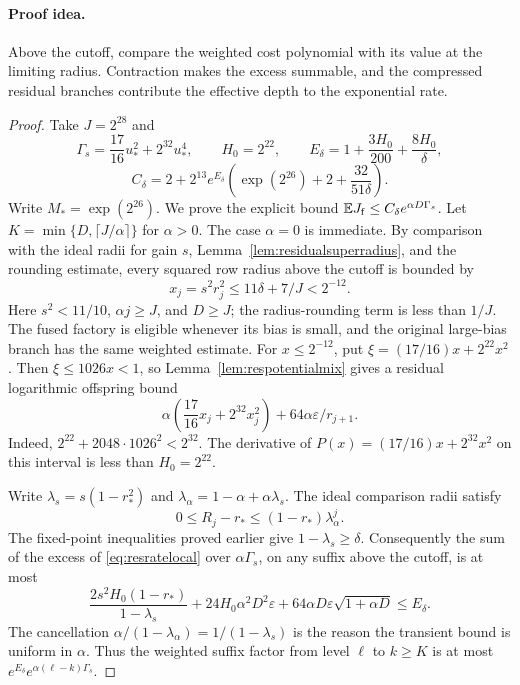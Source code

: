 \paragraph{Proof idea.}
Above the cutoff, compare the weighted cost polynomial with its value at the
limiting radius. Contraction makes the excess summable, and the compressed
residual branches contribute the effective depth to the exponential rate.

\begin{proof}
Take $J=2^{28}$ and
\[
\Gamma_s=\frac{17}{16}u_*^2+2^{32}u_*^4,\qquad H_0=2^{22},
\qquad E_\delta=1+\frac{3H_0}{200}+\frac{8H_0}{\delta},
\]
\begin{equation}\label{eq:residualrateconstant}
C_\delta=2+2^{13}e^{E_\delta}
             \left(\exp(2^{26})+2+\frac{32}{51\delta}\right).
\end{equation}
Write $M_* =\exp(2^{26})$. We prove the explicit bound
$\mathbb E J_{\mathrm f}\le C_\delta e^{\alpha D\Gamma_s}$.
Let $K=\min\{D,\lceil J/\alpha\rceil\}$ for $\alpha>0$.
The case $\alpha=0$ is immediate.
By comparison with the ideal radii for gain $s$,
Lemma~\ref{lem:residualsuperradius}, and the rounding estimate,
every squared row radius above the cutoff is bounded by
\[
x_j=s^2r_j^2\le11\delta+7/J<2^{-12}.
\]
Here $s^2<11/10$, $\alpha j\ge J$, and $D\ge J$;
the radius-rounding term is less than $1/J$.
The fused factory is eligible whenever its bias is small, and
the original large-bias branch has the same weighted estimate.
For $x\le2^{-12}$, put
$\xi=(17/16)x+2^{22}x^2$.
Then $\xi\le1026x<1$, so Lemma~\ref{lem:respotentialmix}
gives a residual logarithmic offspring bound
\begin{equation}\label{eq:resratelocal}
\alpha\left(\frac{17}{16}x_j+2^{32}x_j^2\right)
+64\alpha\varepsilon/r_{j+1}.
\end{equation}
Indeed,
$2^{22}+2048\cdot1026^2<2^{32}$.
The derivative of $P(x)=(17/16)x+2^{32}x^2$ on this interval
is less than $H_0=2^{22}$.

Write $\lambda_s=s(1-r_*^2)$ and
$\lambda_\alpha=1-\alpha+\alpha\lambda_s$.
The ideal comparison radii satisfy
\[
0\le R_j-r_*\le(1-r_*)\lambda_\alpha^j.
\]
The fixed-point inequalities proved earlier give
$1-\lambda_s\ge\delta$.
Consequently the sum of the excess of \eqref{eq:resratelocal}
over $\alpha\Gamma_s$, on any suffix above the cutoff, is at
most
\[
\frac{2s^2H_0(1-r_*)}{1-\lambda_s}
+24H_0\alpha^2D^2\varepsilon
+64\alpha D\varepsilon\sqrt{1+\alpha D}
\le E_\delta.
\]
The cancellation
$\alpha/(1-\lambda_\alpha)=1/(1-\lambda_s)$ is the reason
the transient bound is uniform in $\alpha$.
Thus the weighted suffix factor from level $\ell$ to $k\ge K$
is at most $e^{E_\delta}e^{\alpha(\ell-k)\Gamma_s}$.


\end{proof}
